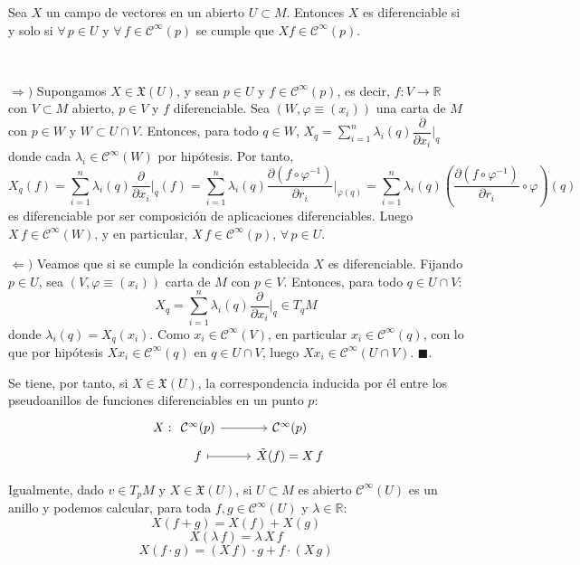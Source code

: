 \begin{prop}
Sea $X$ un campo de vectores en un abierto $U \subset M$. Entonces $X$ es diferenciable si y solo si $\forall \, p \in U$ y $\forall \, f \in \mathcal{C}^{\infty}(p)$ se cumple que $Xf \in \mathcal{C}^{\infty}(p)$.
\end{prop}
\begin{dem} \, 

$\Rightarrow)$ Supongamos $X \in \mathfrak X(U)$, y sean $p \in U$ y $f \in \mathcal{C}^{\infty}(p)$, es decir, $f:V\to \mathbb{R}$ con $V\subset M$ abierto, $p \in V$ y $f$ diferenciable. Sea $(W,\varphi\equiv(x_i))$ una carta de $M$ con $p \in W$ y $W \subset U \cap V$. Entonces, para todo $q \in W$, $\displaystyle X_q = \sum_{i=1}^n \lambda_i(q) \dfrac{\partial}{\partial x_i}\big|_q$ donde cada $\lambda_i \in \mathcal C^{\infty}(W)$ por hip\'otesis. Por tanto, $$X_q(f) = \sum_{i=1}^n \lambda_i(q) \dfrac{\partial}{\partial x_i}\Big|_q (f)= \sum_{i=1}^n \lambda_i(q)  \dfrac{\partial (f\circ \varphi^{-1})}{\partial r_i}\Big|_{\varphi(q)} = \sum_{i=1}^n \lambda_i(q) \left( \dfrac{\partial (f\circ \varphi^{-1})}{\partial r_i} \circ \varphi\right) (q)$$ es diferenciable por ser composición de aplicaciones diferenciables. Luego $X\,f \in \mathcal{C}^{\infty}(W)$, y en particular, $X\,f \in \mathcal{C}^{\infty}(p)$, $\forall\, p\in U$.

$\Leftarrow)$ Veamos que si se cumple la condición establecida $X$ es diferenciable. Fijando $p \in U$, sea $(V,\varphi\equiv(x_i))$ carta de $M$ con $p \in V$. Entonces, para todo $q \in U \cap V$:$$X_q = \sum_{i=1}^n \lambda_i(q) \dfrac{\partial}{\partial x_i}\Big|_q\in T_qM$$donde $\lambda_i(q) = X_q(x_i)$. Como $x_i \in \mathcal{C}^{\infty}(V)$, en particular $x_i \in \mathcal{C}^{\infty}(q)$, con lo que por hipótesis $Xx_i \in \mathcal{C}^{\infty}(q)$ en $q \in U \cap V$, luego $Xx_i \in \mathcal{C}^{\infty}(U\cap V)$. \hfill $\blacksquare.$
\end{dem}

Se tiene, por tanto, si $X\in \mathfrak X(U)$, la correspondencia inducida por él entre los pseudoanillos de funciones diferenciables en un punto $p$:
$$\begin{tikzcd}
X:\hspace{-10mm} & \mathcal{C}^{\infty}(p) \rar & \mathcal{C}^{\infty}(p)\\[-5mm]
& f \arrow[mapsto]{r} & \tilde{X}(f) = X\,f
\end{tikzcd}$$

Igualmente, dado $v \in T_p M$ y $X \in \mathfrak{X}(U)$, si $U\subset M$ es abierto $\mathcal{C}^{\infty}(U)$ es un anillo y podemos calcular, para toda $f,g\in\mathcal{C}^{\infty}(U)$ y $\lambda \in \mathbb{R}$:
$$X(f+g) = X(f) + X(g)$$
$$X(\lambda\,f) = \lambda\,X\,f$$
$$X(f\cdot g) = (X\,f)\cdot g + f \cdot (X\,g)$$

